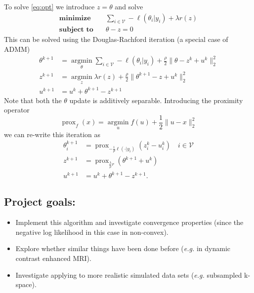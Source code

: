 \documentclass{article}
\newcommand{\argmin}{\operatorname*{argmin}}
\newcommand{\prox}{\operatorname{prox}}
\begin{document}
To solve \ref{eq:opt} we introduce $z = \theta$ and solve
\begin{equation}
\begin{split}
\textbf{minimize} & \quad  \sum_{i \in \mathcal{V}} -\ell(\theta_i | y_i) + \lambda r(z) \\
\textbf{subject to} & \quad \theta - z = 0
\end{split} 
\end{equation} 
This can be solved using the Douglas-Rachford iteration (a special case of ADMM) 
\[
\begin{split} 
\theta^{k+1} &= \argmin_\theta  \sum_{i \in \mathcal{V}} -\ell(\theta_i | y_i) + \frac{\rho}{2} \|\theta - z^k + u^k \|_2^2 \\
z^{k+1} &= \argmin_z \lambda r(z) + \frac{\rho}{2} \| \theta^{k+1} - z + u^k \|_2^2 \\
u^{k+1} &= u^k + \theta^{k+1} - z^{k+1}
\end{split} 
\]
Note that both the $\theta$ update is additively separable. Introducing the proximity operator
\[
\prox_f(x) = \argmin_u f(u) + \frac{1}{2} \|u - x\|_2^2 
\]
we can re-write this iteration as 
\[
\begin{split} 
\theta_i^{k+1} &= \prox_{-\frac{1}{\rho} \ell(\cdot | y_i)} (z_i^k - u_i^k) \quad i \in \mathcal{V} \\
z^{k+1} &= \prox_{\frac{\lambda}{\rho} r} (\theta^{k+1} + u^k) \\
u^{k+1} &= u^k + \theta^{k+1} - z^{k+1}. 
\end{split} 
\]

\subsection{Project goals:}
\begin{itemize}
\item Implement this algorithm and investigate convergence properties (since the negative log likelihood in this case in non-convex). 
\item Explore whether similar things have been done before (\emph{e.g.} in dynamic contrast enhanced MRI). 
\item Investigate applying to more realistic simulated data sets (\emph{e.g.} subsampled k-space). 
\end{itemize} 



\end{document}
